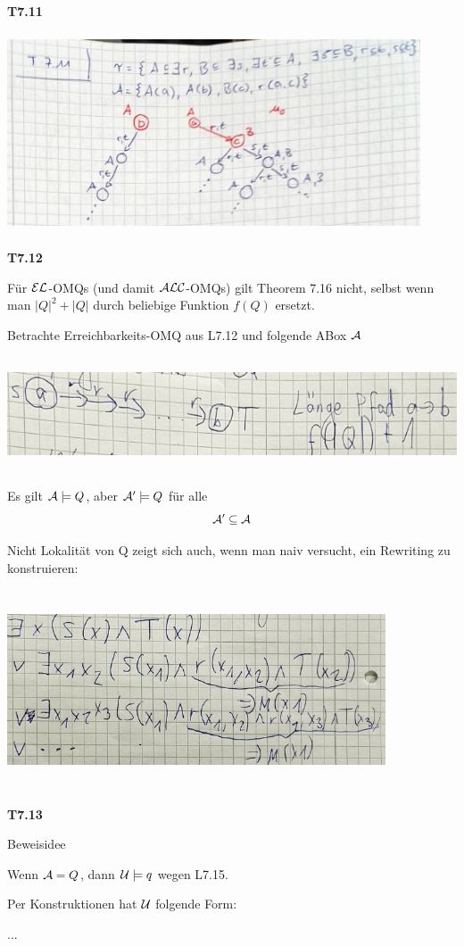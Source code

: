 \textbf{T7.11}

\includegraphics[width=4.81910in,height=2.33200in]{media/711um.png}

\textbf{T7.12}

Für $\mathcal{E}\mathcal{L}$-OMQs (und damit $\mathcal{A}\mathcal{L}\mathcal{C}$-OMQs) gilt Theorem 7.16 nicht, selbst wenn man $|Q|^2 + |Q|$ durch beliebige Funktion $f(Q)$ ersetzt. 

Betrachte Erreichbarkeits-OMQ aus L7.12 und folgende ABox $\mathcal{A}$

\includegraphics[width=7.41910in,height=1.33200in]{media/712elomq.png}

Es gilt $\mathcal{A} \models Q$, aber $\mathcal{A}' \models Q$ für alle $$\mathcal{A}' \subseteq \mathcal{A}$$

Nicht Lokalität von Q zeigt sich auch, wenn man naiv versucht, ein Rewriting zu konstruieren:

\includegraphics[width=4.41910in,height=2.33200in]{media/712rew.png}

\textbf{T7.13}

Beweisidee

Wenn $\mathcal{A} = Q$, dann $\mathcal{U} \models q$ wegen L7.15.

Per Konstruktionen hat $\mathcal{U}$ folgende Form:

...